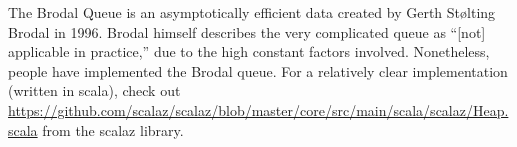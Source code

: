 The Brodal Queue is an asymptotically efficient data created by Gerth Stølting Brodal in 1996.  Brodal himself describes the very complicated queue as ``[not] applicable in practice,'' due to the high constant factors involved.  Nonetheless, people have implemented the Brodal queue.  For a relatively clear implementation (written in scala), check out \url{https://github.com/scalaz/scalaz/blob/master/core/src/main/scala/scalaz/Heap.scala} from the scalaz library.
